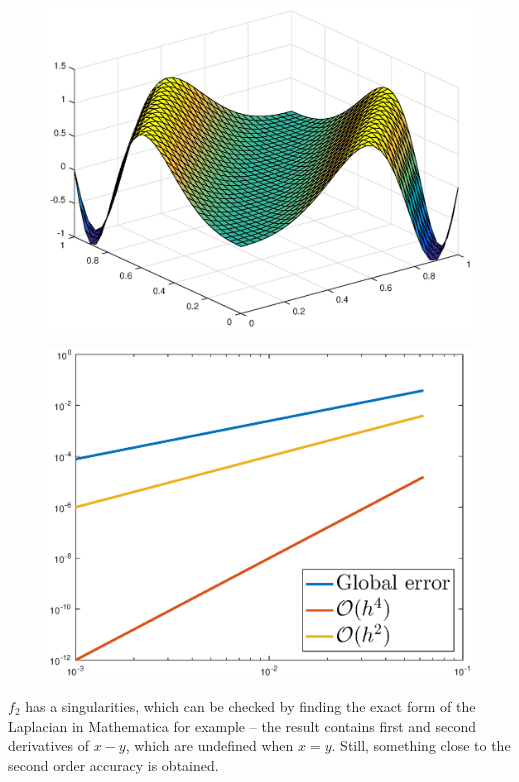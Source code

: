 \documentclass[main.tex]{subfiles}
\begin{document}
\begin{figure}[h]
\centering
\begin{minipage}{.45\textwidth}
  \centering
  \includegraphics[width=.9\linewidth]{../Figures/ex2u2calc}
  \label{fig:ex2:u2calc}
\end{minipage}\hfill%
\begin{minipage}{.45\textwidth}
  \centering
  \includegraphics[width=.9\linewidth]{../Figures/ex2u2err}
  \label{fig:ex2:u2err}
\end{minipage}
\end{figure}

$f_2$ has a singularities, which can be checked by finding the exact form of the Laplacian in Mathematica for example -- the result contains first and second derivatives of $x-y$, which are undefined when $x=y$. Still, something close to the second order accuracy is obtained.
\end{document}
